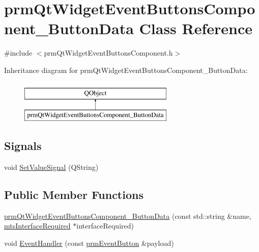 \hypertarget{classprm_qt_widget_event_buttons_component___button_data}{\section{prm\-Qt\-Widget\-Event\-Buttons\-Component\-\_\-\-Button\-Data Class Reference}
\label{classprm_qt_widget_event_buttons_component___button_data}
}


{\ttfamily \#include $<$prm\-Qt\-Widget\-Event\-Buttons\-Component.\-h$>$}

Inheritance diagram for prm\-Qt\-Widget\-Event\-Buttons\-Component\-\_\-\-Button\-Data\-:\begin{figure}[H]
\begin{center}
\leavevmode
\includegraphics[height=2.000000cm]{d6/d93/classprm_qt_widget_event_buttons_component___button_data}
\end{center}
\end{figure}
\subsection*{Signals}
\begin{DoxyCompactItemize}
\item 
void \hyperlink{classprm_qt_widget_event_buttons_component___button_data_ab4cf021a6448593acf4efdf52f5fca21}{Set\-Value\-Signal} (Q\-String)
\end{DoxyCompactItemize}
\subsection*{Public Member Functions}
\begin{DoxyCompactItemize}
\item 
\hyperlink{classprm_qt_widget_event_buttons_component___button_data_a8d54aa9c0bb6f28ce10d1398a72e9cdb}{prm\-Qt\-Widget\-Event\-Buttons\-Component\-\_\-\-Button\-Data} (const std\-::string \&name, \hyperlink{classmts_interface_required}{mts\-Interface\-Required} $\ast$interface\-Required)
\item 
void \hyperlink{classprm_qt_widget_event_buttons_component___button_data_a982a7c664eccf38d1f587d22e6d2c147}{Event\-Handler} (const \hyperlink{classprm_event_button}{prm\-Event\-Button} \&payload)
\end{DoxyCompactItemize}
